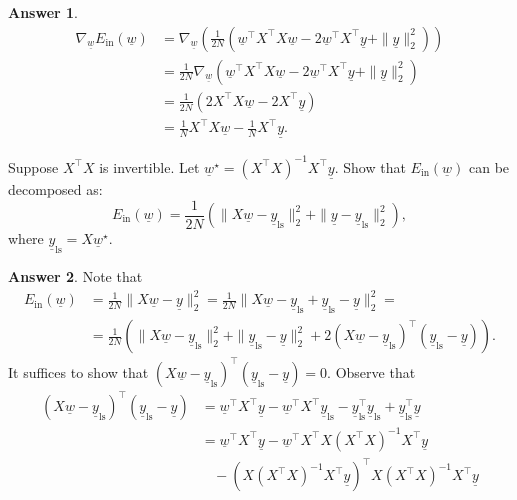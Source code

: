 \documentclass{article}
\renewcommand{\vec}[1]{\underline{#1}}
\newcommand{\vecw}{\vec{w}}
\newcommand{\vecy}{\vec{y}}
\theoremstyle{definition}
\newtheorem*{answer}{Answer}
\begin{document}
\begin{question}[start=0]
\begin{question}
\begin{answer}
\begin{align*}
				\nabla_{\!\underline{w}} E_{\text{in}}(\underline{w}) &= \nabla_{\!\underline{w}} \left(\frac{1}{2N}\left(\vecw^\top X^\top X \vecw - 2\vecw^\top X^\top \vecy + \|\vecy\|_2^2\right)\right)\\
				&= \frac{1}{2N} \nabla_{\!\underline{w}} \left(\vecw^\top X^\top X \vecw - 2\vecw^\top X^\top \vecy + \|\vecy\|_2^2\right)\\
				&= \frac{1}{2N} (2 X^\top X \vecw - 2 X^\top \vecy)\\
				&= \frac{1}{N} X^\top X \vecw - \frac{1}{N} X^\top \vecy.
			\end{align*}
		\end{answer}
		\item \label{partc}Suppose $X^\top X$ is invertible. Let $\vecw^\star = (X^\top X)^{-1} X^\top \vecy$. Show that $E_{\text{in}}(\vecw)$ can be decomposed as:
		\begin{equation*}
		E_{\text{in}}(\vecw) = \frac{1}{2N}\left(\|X \vecw - \vecy_{\text{ls}}\|_2^2 + \|\vecy - \vecy_{\text{ls}}\|_2^2\right),
		\end{equation*}
		where $\vecy_{\text{ls}} = X \vecw^\star$.
		\begin{answer}
			Note that
			\begin{align*}
				E_{\text{in}}(\vecw) &= \frac{1}{2N}\|X \underline{w} - \underline{y}\|_{2}^2 = \frac{1}{2N}\|X \underline{w} - \underline{y}_{\text{ls}} + \underline{y}_{\text{ls}} -\underline{y}\|_{2}^2 =\\
				&=\frac{1}{2N} \left(\|X \underline{w} - \underline{y}_{\text{ls}}\|_{2}^2 + \|\underline{y}_{\text{ls}} - \underline{y}\|_{2}^2 + 2 (X \underline{w} - \underline{y}_{\text{ls}})^\top (\underline{y}_{\text{ls}} - \underline{y})\right).
			\end{align*}
			It suffices to show that $(X \underline{w} - \underline{y}_{\text{ls}})^\top (\underline{y}_{\text{ls}} - \underline{y})=0$. Observe that 
			\begin{align*}
				(X \underline{w} - \underline{y}_{\text{ls}})^\top (\underline{y}_{\text{ls}} - \underline{y}) &= \underline{w}^\top X^\top \underline{y} - \underline{w}^\top X^\top \underline{y}_{\text{ls}} - \underline{y}_{\text{ls}}^\top \underline{y}_{\text{ls}} +  \underline{y}_{\text{ls}}^\top \underline{y}\\
				&= \underline{w}^\top X^\top \underline{y} - \underline{w}^\top X^\top X (X^\top X)^{-1} X^\top \vecy\\
				&~~~~ - (X (X^\top X)^{-1} X^\top \vecy)^\top X (X^\top X)^{-1} X^\top \vecy\\

\end{align*}
\end{answer}
\end{question}
\end{question}
\end{document}
